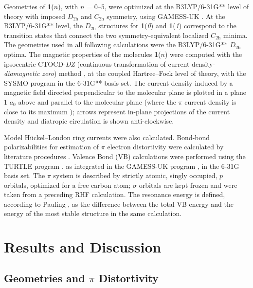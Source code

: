 Geometries of \textbf{1}($n$), with $n$ = 0--5, were optimized at the B3LYP/6-31G** level of theory with imposed $D_\mathrm{2h}$ and $C_\mathrm{2h}$ symmetry, using GAMESS-UK  \cite{r20}. At the B3LYP/6-31G** level, the $D_\mathrm{2h}$ structures for \textbf{1}(\textit{0}) and \textbf{1}(\textit{1}) correspond to the transition states that connect the two symmetry-equivalent localized $C_\mathrm{2h}$ minima. The geometries used in all following calculations were the B3LYP/6-31G** $D_\mathrm{2h}$ optima. The magnetic properties of the molecules \textbf{1}($n$) were computed with the ipsocentric CTOCD-\textit{DZ} (continuous transformation of current density-\textit{diamagnetic zero}) method  \cite{r21,r22,r23,r24}, at the coupled Hartree--Fock level of theory, with the SYSMO program  \cite{r25} in the 6-31G** basis set. The current density induced by a magnetic field directed perpendicular to the molecular plane is plotted in a plane 1 $a_0$ above and parallel to the molecular plane (where the $\pi$ current density is close to its maximum  \cite{r18}); arrows represent in-plane projections of the current density and diatropic circulation is shown anti-clockwise.

Model H\"uckel--London ring currents  \cite{r26,r27} were also calculated. Bond-bond polarizabilities for estimation of $\pi$ electron distortivity were calculated by literature procedures   \cite{r08,r17,r28,r29,r30}. Valence Bond (VB) calculations were performed using the TURTLE program   \cite{r31}, as integrated in the GAMESS-UK program  \cite{r20}, in the 6-31G basis set. The $\pi$ system is described by strictly atomic, singly occupied, $p$ orbitals, optimized for a free carbon atom; $\sigma$ orbitals are kept frozen and were taken from a preceding RHF calculation. The resonance energy is defined, according to Pauling  \cite{r32,r33}, as the difference between the total VB energy and the energy of the most stable structure in the same calculation.

\section{Results and Discussion}

\subsection{Geometries and $\pi$ Distortivity}

